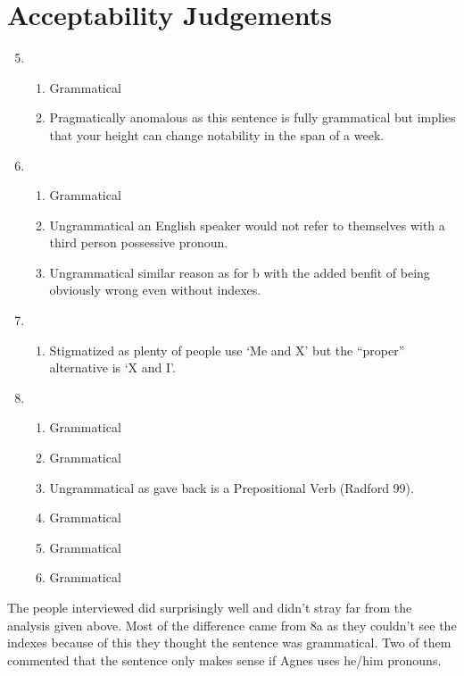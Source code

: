 \documentclass{article}
\begin{document}

\newpage

\section{Acceptability Judgements}
\begin{enumerate}[label=(\theenumi)]
\setcounter{enumi}{4}
\item
  \begin{enumerate}[label=\alph*.]
  \item Grammatical
  \item Pragmatically anomalous as this sentence is fully grammatical but
    implies that your height can change notability in the span of a week.
  \end{enumerate}
\item
  \begin{enumerate}[label=\alph*.]
  \item Grammatical
  \item Ungrammatical an English speaker would not refer to themselves with a
    third person possessive pronoun.
  \item Ungrammatical similar reason as for b with the added benfit of being
    obviously wrong even without indexes.
  \end{enumerate}
\item
  \begin{enumerate}[label=\alph*.]
  \item Stigmatized as plenty of people use `Me and X' but the ``proper''
    alternative is `X and I'.
  \end{enumerate}
\item
  \begin{enumerate}[label=\alph*.]
  \item Grammatical
  \item Grammatical
  \item Ungrammatical as gave back is a Prepositional Verb (Radford 99).
  \item Grammatical
  \item Grammatical
  \item Grammatical
  \end{enumerate}
\end{enumerate}
The people interviewed did surprisingly well and didn't stray far from the
analysis given above. Most of the difference came from 8a as they couldn't see
the indexes because of this they thought the sentence was grammatical. Two of
them commented that the sentence only makes sense if Agnes uses he/him pronouns.
\end{document}
